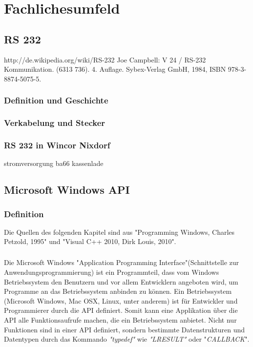\chapter{Fachlichesumfeld}

\section{RS 232}
http://de.wikipedia.org/wiki/RS-232
Joe Campbell: V 24 / RS-232 Kommunikation. (6313 736). 4. Auflage. Sybex-Verlag GmbH, 1984, ISBN 978-3-8874-5075-5.

\subsection{Definition und Geschichte}


\subsection{Verkabelung und Stecker}


\subsection{RS 232 in Wincor Nixdorf}
stromversorgung
ba66
kassenlade


\newpage


\section{Microsoft Windows API}


\subsection{Definition}

Die Quellen des folgenden Kapitel sind aus "Programming Windows, Charles Petzold, 1995" und "Visual C++ 2010, Dirk Louis, 2010".

\paragraph{}
Die Microsoft Windows "Application Programming Interface"(Schnittstelle zur Anwendungsprogrammierung) ist ein Programmteil, dass vom Windows Betriebssystem den Benutzern und vor allem Entwicklern angeboten wird, um Programme an das Betriebssystem anbinden zu können. Ein Betriebssystem (Microsoft Windows, Mac OSX, Linux, unter anderem) ist für Entwickler und Programmierer durch die API definiert. Somit kann eine Applikation über die API alle Funktionsaufrufe machen, die ein Betriebssystem anbietet. Nicht nur Funktionen sind in einer API definiert, sondern bestimmte Datenstrukturen und Datentypen durch das Kommando \textit{"typedef"} wie \textit{"LRESULT"} oder "\textit{CALLBACK}".
